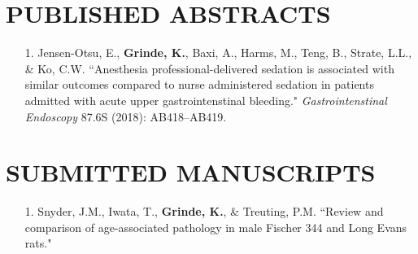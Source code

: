 \documentclass[margin]{res}
\newenvironment{benumerate}[1]{
    \let\oldItem\item
    \def\item{\addtocounter{enumi}{-2}\oldItem}
    
    \begin{enumerate}
    \setcounter{enumi}{#1}
    \addtocounter{enumi}{1}
}{
    \end{enumerate}
}
\begin{document}
\begin{resume}
\section{PUBLISHED ABSTRACTS}

\begin{itemize}
\item[1.] Jensen-Otsu, E., \textbf{Grinde, K.}, Baxi, A., Harms, M., Teng, B., Strate, L.L., \& Ko, C.W. 
``Anesthesia professional-delivered sedation is associated with similar outcomes compared to nurse administered sedation in patients admitted with acute upper gastrointenstinal bleeding." \textit{Gastrointenstinal Endoscopy} 87.6S (2018):  AB418--AB419.\\
\end{itemize}

\section{SUBMITTED MANUSCRIPTS}
\begin{itemize}
\item[1.] Snyder, J.M., Iwata, T., \textbf{Grinde, K.}, \& Treuting, P.M. 
``Review and comparison of age-associated pathology in male Fischer 344 and Long Evans rats."  \\
\end{itemize}







\end{resume}
\end{document}
